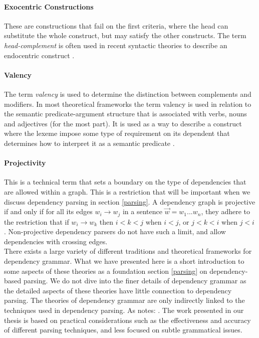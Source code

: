 \paragraph{Exocentric Constructions} These are constructions that fail on the first criteria, where the head can substitute the whole construct, but may satisfy the other constructs. The term \textit{head-complement} is often used in recent syntactic theories to describe an endocentric construct \cite{Niv:05}.

\paragraph{Valency} The term \textit{valency} is used to determine the distinction between complements and modifiers. In most theoretical frameworks the term valency is used in relation to the semantic predicate-argument structure that is associated with verbs, nouns and adjectives (for the most part). It is used as a way to describe a construct where the lexeme impose some type of requirement on its dependent that determines how to interpret it as a semantic predicate \cite{Niv:05}.

\paragraph{Projectivity} This is a technical term that sets a boundary on the type of dependencies that are allowed within a graph. This is a restriction that will be important when we discuss dependency parsing in section \ref{parsing}. A dependency graph is projective if and only if for all its edges $w_i \rightarrow w_j$ in a sentence $\vec{w} = w_1 ... w_n$, they adhere to the restriction that if $w_i \rightarrow w_k$ then $i < k < j$ when $i < j$, or $j < k < i$ when $j < i$ \cite{KublerEtAl:09}. Non-projective dependency parsers do not have such a limit, and allow dependencies with crossing edges. \\

There exists a large variety of different traditions and theoretical frameworks for dependency grammar. What we have presented here is a short introduction to some aspects of these theories as a foundation section \ref{parsing} on dependency-based parsing. We do not dive into the finer details of dependency grammar as the detailed aspects of these theories have little connection to dependency parsing. The theories of dependency grammar are only indirectly linked to the techniques used in dependency parsing. As \citeauthor{Niv:05} notes:  \cite{Niv:05}. The work presented in our thesis is based on practical considerations such as the effectiveness and accuracy of different parsing techniques, and less focused on subtle grammatical issues.

